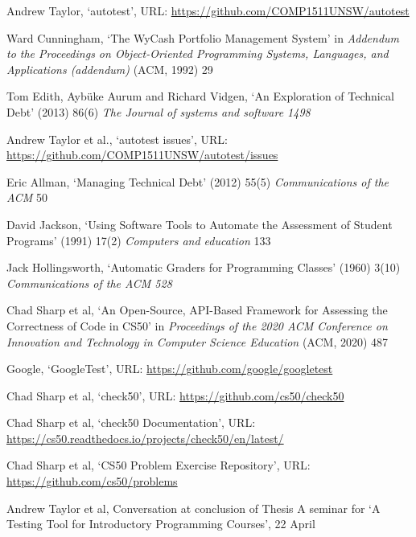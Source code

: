 \documentclass[hidelinks]{report}
\begin{document}
\begin{thebibliography}{99}
	
Andrew Taylor, ‘autotest’, URL: \url{https://github.com/COMP1511UNSW/autotest}

Ward Cunningham, ‘The WyCash Portfolio Management System’ in \textit{Addendum to the Proceedings on Object-Oriented Programming Systems, Languages, and Applications (addendum)} (ACM, 1992) 29

Tom Edith, Aybüke Aurum and Richard Vidgen, ‘An Exploration of Technical Debt’ (2013) 86(6) \textit{The Journal of systems and software 1498}

Andrew Taylor et al., ‘autotest issues’, URL: \url{https://github.com/COMP1511UNSW/autotest/issues}

Eric Allman, ‘Managing Technical Debt’ (2012) 55(5) \textit{Communications of the ACM} 50

David Jackson, ‘Using Software Tools to Automate the Assessment of Student Programs’ (1991) 17(2) \textit{Computers and education} 133

Jack Hollingsworth, ‘Automatic Graders for Programming Classes’ (1960) 3(10) \textit{Communications of the ACM 528}

Chad Sharp et al, ‘An Open-Source, API-Based Framework for Assessing the Correctness of Code in CS50’ in \textit{Proceedings of the 2020 ACM Conference on Innovation and Technology in Computer Science Education} (ACM, 2020) 487

Google, ‘GoogleTest’, URL: \url{https://github.com/google/googletest}

Chad Sharp et al, ‘check50’, URL: \url{https://github.com/cs50/check50}

Chad Sharp et al, ‘check50 Documentation’, URL: \url{https://cs50.readthedocs.io/projects/check50/en/latest/}

Chad Sharp et al, ‘CS50 Problem Exercise Repository’, URL: \url{https://github.com/cs50/problems}

Andrew Taylor et al, Conversation at conclusion of Thesis A seminar for ‘A Testing Tool for Introductory Programming Courses’, 22 April


\end{thebibliography}
\end{document}
